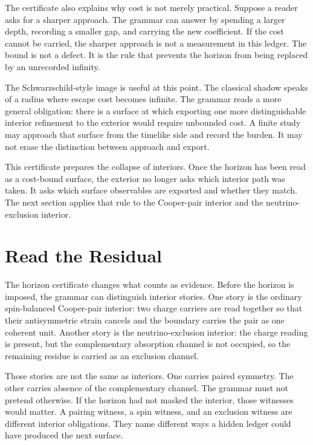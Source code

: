 The certificate also explains why cost is not merely practical. Suppose a
reader asks for a sharper approach. The grammar can answer by spending a
larger depth, recording a smaller gap, and carrying the new coefficient. If
the cost cannot be carried, the sharper approach is not a measurement in
this ledger. The bound is not a defect. It is the rule that prevents the
horizon from being replaced by an unrecorded infinity.

The Schwarzschild-style image is useful at this point. The classical shadow
speaks of a radius where escape cost becomes infinite. The grammar reads a
more general obligation: there is a surface at which exporting one more
distinguishable interior refinement to the exterior would require unbounded
cost. A finite study may approach that surface from the timelike side and
record the burden. It may not erase the distinction between approach and
export.

This certificate prepares the collapse of interiors. Once the horizon has
been read as a cost-bound surface, the exterior no longer asks which
interior path was taken. It asks which surface observables are exported and
whether they match. The next section applies that rule to the Cooper-pair
interior and the neutrino-exclusion interior.

\section{Read the Residual}

The horizon certificate changes what counts as evidence. Before the horizon
is imposed, the grammar can distinguish interior stories. One story is the
ordinary spin-balanced Cooper-pair interior: two charge carriers are read
together so that their antisymmetric strain cancels and the boundary carries
the pair as one coherent unit. Another story is the neutrino-exclusion
interior: the charge reading is present, but the complementary absorption
channel is not occupied, so the remaining residue is carried as an exclusion
channel.

Those stories are not the same as interiors. One carries paired symmetry.
The other carries absence of the complementary channel. The grammar must not
pretend otherwise. If the horizon had not masked the interior, those
witnesses would matter. A pairing witness, a spin witness, and an exclusion
witness are different interior obligations. They name different ways a
hidden ledger could have produced the next surface.

